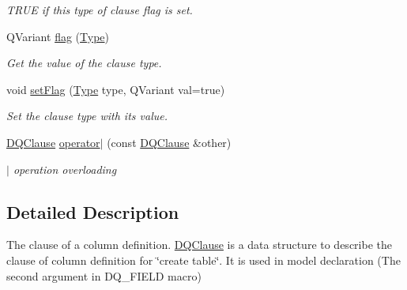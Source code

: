 \begin{DoxyCompactItemize}
\begin{DoxyCompactList}\small\item\em TRUE if this type of clause flag is set. \item\end{DoxyCompactList}\item 
\hypertarget{classDQClause_a6b227de35ff798cb8f991e2f9244dca4}{
QVariant \hyperlink{classDQClause_a6b227de35ff798cb8f991e2f9244dca4}{flag} (\hyperlink{classDQClause_a8cbc814ce3412035fbaa066b20689fe3}{Type})}
\label{classDQClause_a6b227de35ff798cb8f991e2f9244dca4}

\begin{DoxyCompactList}\small\item\em Get the value of the clause type. \item\end{DoxyCompactList}\item 
\hypertarget{classDQClause_a64fa46e82a204f845ae5681f396dce89}{
void \hyperlink{classDQClause_a64fa46e82a204f845ae5681f396dce89}{setFlag} (\hyperlink{classDQClause_a8cbc814ce3412035fbaa066b20689fe3}{Type} type, QVariant val=true)}
\label{classDQClause_a64fa46e82a204f845ae5681f396dce89}

\begin{DoxyCompactList}\small\item\em Set the clause type with its value. \item\end{DoxyCompactList}\item 
\hyperlink{classDQClause}{DQClause} \hyperlink{classDQClause_a157d5e9daa642490f7530aba2fe1dc4d}{operator$|$} (const \hyperlink{classDQClause}{DQClause} \&other)
\begin{DoxyCompactList}\small\item\em $|$ operation overloading \item\end{DoxyCompactList}\end{DoxyCompactItemize}


\subsection{Detailed Description}
The clause of a column definition. \hyperlink{classDQClause}{DQClause} is a data structure to describe the clause of column definition for \char`\"{}create table\char`\"{}. It is used in model declaration (The second argument in DQ\_\-FIELD macro)

